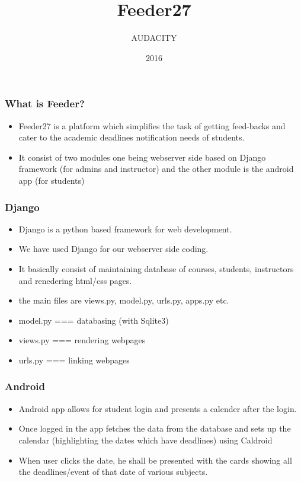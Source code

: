 \documentclass{beamer}
\title{Feeder27}
\author{AUDACITY}
\institute{IIT Bombay}
\date{2016}
\begin{document}
 
\frame{\titlepage}
 
\begin{frame}
\frametitle{What is Feeder?}
\begin{itemize}
    \item Feeder27 is a platform which simplifies the task of getting feed-backs and cater to the academic deadlines notification needs of students.
    \item It consist of two modules one being webserver side based on Django framework (for admins and instructor)  and the other module is the android app (for students)
\end{itemize}
\end{frame}
 
\begin{frame}
\frametitle{Django}
\begin{itemize}
    \item Django is a python based framework for web development.
    \item We have used Django for our webserver side coding.
    \item It basically consist of maintaining database of courses, students, instructors and renedering html/css pages.
    \item the main files are views.py, model.py, urls.py, apps.py etc.
    \item model.py === databasing (with Sqlite3)
    \item views.py === rendering webpages
    \item urls.py === linking webpages
\end{itemize}
\end{frame}

\begin{frame}
\frametitle{Android}
\begin{itemize}
    \item Android app allows for student login and presents a calender after the login.
    \item Once logged in the app fetches the data from the database and sets up the calendar (highlighting the dates which have deadlines) using Caldroid
    \item When user clicks the date, he shall be presented with the cards showing all the deadlines/event of that date of various subjects.
\end{itemize}
\end{frame}
\end{document}
